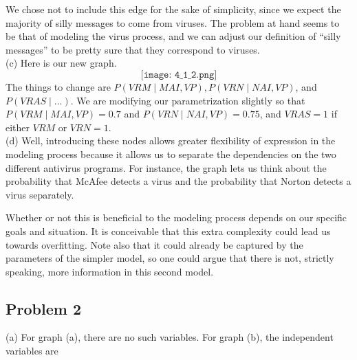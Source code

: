 \documentclass[12pt]{article}
\theoremstyle{remark}
\begin{document}
We chose not to include this edge for the sake of simplicity, since we expect the majority of silly messages to come from viruses. The problem at hand seems to be that of modeling the virus process, and we can adjust our definition of ``silly messages'' to be pretty sure that they correspond to viruses. \\

\noindent (c) Here is our new graph.
\[
\texttt{[image: 4\_1\_2.png]}
\]
The things to change are $P(VRM \mid MAI , VP), P(VRN \mid NAI, VP)$, and $P(VRAS \mid ...)$. We are modifying our parametrization slightly so that $P(VRM \mid MAI, VP) = 0.7$ and $P(VRN \mid NAI, VP) = 0.75$, and $VRAS = 1$ if either $VRM$ or $VRN = 1$. \\

\noindent (d) Well, introducing these nodes allows greater flexibility of expression in the modeling process because it allows us to separate the dependencies on the two different antivirus programs. For instance, the graph lets us think about the probability that McAfee detects a virus and the probability that Norton detects a virus separately. 

Whether or not this is beneficial to the modeling process depends on our specific goals and situation. It is conceivable that this extra complexity could lead us towards overfitting. Note also that it could already be captured by the parameters of the simpler model, so one could argue that there is not, strictly speaking, more information in this second model. 

\subsection*{Problem 2} (a) For graph (a), there are no such variables. For graph (b), the independent variables are 
\end{document}

